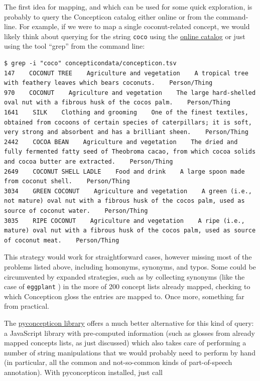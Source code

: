 \documentclass[
  a4paper,
  14pt,
  oneside,
  tablecaptionabove
]{scrbook}
\newcommand{\passthrough}[1]{#1}
\begin{document}
The first idea for mapping, and which can be used for some quick
exploration, is probably to query the Concepticon catalog either online
or from the command-line. For example, if we were to map a single
coconut-related concept, we would likely think about querying for the
string \passthrough{\lstinline!coco!} using the
\href{https://concepticon.clld.org/parameters}{online catalog} or just
using the tool \enquote{grep} from the command line:

\begin{lstlisting}
$ grep -i "coco" concepticondata/concepticon.tsv
147    COCONUT TREE    Agriculture and vegetation    A tropical tree with feathery leaves which bears coconuts.    Person/Thing
970    COCONUT    Agriculture and vegetation    The large hard-shelled oval nut with a fibrous husk of the cocos palm.    Person/Thing
1641    SILK    Clothing and grooming    One of the finest textiles, obtained from cocoons of certain species of caterpillars; it is soft, very strong and absorbent and has a brilliant sheen.    Person/Thing
2442    COCOA BEAN    Agriculture and vegetation    The dried and fully fermented fatty seed of Theobroma cacao, from which cocoa solids and cocoa butter are extracted.    Person/Thing
2649    COCONUT SHELL LADLE    Food and drink    A large spoon made from coconut shell.    Person/Thing
3034    GREEN COCONUT    Agriculture and vegetation    A green (i.e., not mature) oval nut with a fibrous husk of the cocos palm, used as source of coconut water.    Person/Thing
3035    RIPE COCONUT    Agriculture and vegetation    A ripe (i.e., mature) oval nut with a fibrous husk of the cocos palm, used as source of coconut meat.    Person/Thing
\end{lstlisting}

This strategy would work for straightforward cases, however missing most
of the problems listed above, including homonyms, synonyms, and typos.
Some could be circumvented by expanded strategies, such as by collecting
synonyms (like the case of \passthrough{\lstinline!eggplant!} ) in the
more of 200 concept lists already mapped, checking to which Concepticon
gloss the entries are mapped to. Once more, something far from
practical.

The \href{https://pypi.org/project/pyconcepticon/}{pyconcepticon
library} offers a much better alternative for this kind of query: a
JavaScript library with pre-computed information (such as glosses from
already mapped concepts lists, as just discussed) which also takes care
of performing a number of string manipulations that we would probably
need to perform by hand (in particular, all the common and not-so-common
kinds of part-of-speech annotation). With pyconcepticon installed, just
call
\end{document}
